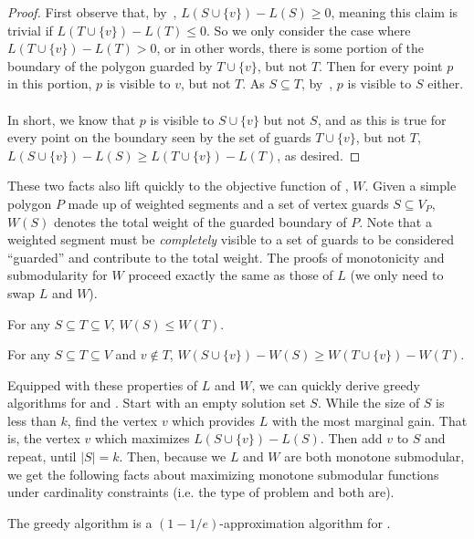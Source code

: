 \begin{proof}
    First observe that, by~, $L(S\cup\{v\})-L(S)\geq 0$, meaning this claim is trivial if $L(T\cup\{v\})-L(T)\leq 0$. So we only consider the case where $L(T\cup\{v\})-L(T)>0$, or in other words, there is some portion of the boundary of the polygon guarded by $T\cup\{v\}$, but not $T$. Then for every point $p$ in this portion, $p$ is visible to $v$, but not $T$. As $S\subseteq T$, by~, $p$ is visible to $S$ either. \\\\
    In short, we know that $p$ is visible to $S\cup\{v\}$ but not $S$, and as this is true for every point on the boundary seen by the set of guards $T\cup\{v\}$, but not $T$, $L(S\cup\{v\})-L(S)\geq L(T\cup\{v\})-L(T)$, as desired.
\end{proof}
\noindent
These two facts also lift quickly to the objective function of \MVVG{}, $W$. Given a simple polygon $P$ made up of weighted segments and a set of vertex guards $S\subseteq V_P$, $W(S)$ denotes the total weight of the guarded boundary of $P$. Note that a weighted segment must be \emph{completely} visible to a set of guards to be considered ``guarded'' and contribute to the total weight. The proofs of monotonicity and submodularity for $W$ proceed exactly the same as those of $L$ (we only need to swap $L$ and $W$).

\begin{observation}\label{obs:monotone-w}
    For any $S\subseteq T\subseteq V$, $W(S)\leq W(T)$.
\end{observation}

\begin{claim}\label{clm:submodular-w}
    For any $S\subseteq T\subseteq V$ and $v\notin T$, $W(S\cup\{v\})-W(S)\geq W(T\cup\{v\})-W(T)$.
\end{claim}
\noindent
Equipped with these properties of $L$ and $W$, we can quickly derive greedy algorithms for \MLVG{} and \MVVG{}. Start with an empty solution set $S$. While the size of $S$ is less than $k$, find the vertex $v$ which provides $L$ with the most marginal gain. That is, the vertex $v$ which maximizes $L(S\cup\{v\})-L(S)$. Then add $v$ to $S$ and repeat, until $|S|=k$. Then, because we $L$ and $W$ are both monotone submodular, we get the following facts about maximizing monotone submodular functions under cardinality constraints (i.e. the type of problem \MLVG{} and \MVVG{} both are).

\begin{theorem}
    The greedy algorithm is a $(1-1/e)$-approximation algorithm for \MLVG{}. 
\end{theorem}

